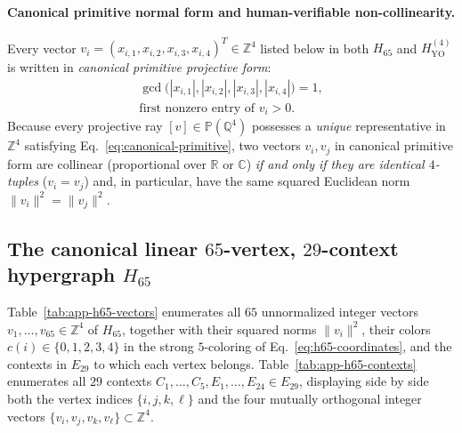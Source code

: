 \documentclass[
  aps,
  pra,
  reprint,
  superscriptaddress,
  amsmath,
  amssymb,
  nofootinbib,
  floatfix
]{revtex4-2}
\theoremstyle{definition}
\theoremstyle{remark}
\newcommand{\R}{\mathbb{R}}
\newcommand{\Q}{\mathbb{Q}}
\newcommand{\C}{\mathbb{C}}
\newcommand{\PP}{\mathbb{P}}
\newcommand{\YO}{\mathrm{YO}}
\begin{document}
\paragraph*{Canonical primitive normal form and human-verifiable non-collinearity.}
Every vector $v_i=(x_{i,1},x_{i,2},x_{i,3},x_{i,4})^T\in\mathbb{Z}^4$ listed below in both $H_{65}$ and $H_{\YO}^{(4)}$ is written in \emph{canonical primitive projective form}:
\begin{equation}\label{eq:canonical-primitive}
\begin{gathered}
\gcd\bigl(|x_{i,1}|,|x_{i,2}|,|x_{i,3}|,|x_{i,4}|\bigr)=1,\\
\text{first nonzero entry of }v_i > 0.
\end{gathered}
\end{equation}
Because every projective ray $[v]\in\PP(\Q^4)$ possesses a \emph{unique} representative in $\mathbb{Z}^4$ satisfying Eq.~\eqref{eq:canonical-primitive}, two vectors $v_i,v_j$ in canonical primitive form are collinear (proportional over $\R$ or $\C$) \emph{if and only if they are identical $4$-tuples} ($v_i=v_j$) and, in particular, have the same squared Euclidean norm $\|v_i\|^2=\|v_j\|^2$.

\subsection{The canonical linear \texorpdfstring{$65$}{65}-vertex, \texorpdfstring{$29$}{29}-context hypergraph \texorpdfstring{$H_{65}$}{H\_65}}\label{app:h65}

Table~\ref{tab:app-h65-vectors} enumerates all $65$ unnormalized integer vectors $v_1,\ldots,v_{65}\in\mathbb{Z}^4$ of $H_{65}$, together with their squared norms $\|v_i\|^2$, their colors $c(i)\in\{0,1,2,3,4\}$ in the strong $5$-coloring of Eq.~\eqref{eq:h65-coordinates}, and the contexts in $E_{29}$ to which each vertex belongs. Table~\ref{tab:app-h65-contexts} enumerates all $29$ contexts $C_1,\ldots,C_5,E_1,\ldots,E_{24}\in E_{29}$, displaying side by side both the vertex indices $\{i,j,k,\ell\}$ and the four mutually orthogonal integer vectors $\{v_i,v_j,v_k,v_\ell\}\subset\mathbb{Z}^4$.
\end{document}
